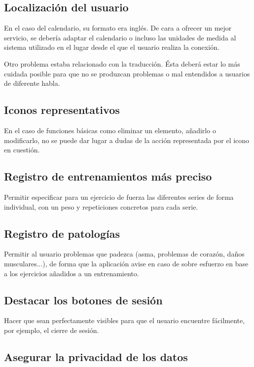 \documentclass[a4paper]{article}
\begin{document}
	\subsection{Localización del usuario}
	
	En el caso del calendario, su formato era inglés. De cara a ofrecer un mejor servicio, se debería adaptar el calendario o incluso las unidades de medida al sistema utilizado en el lugar desde el que el usuario realiza la conexión.
	
	Otro problema estaba relacionado con la traducción. Ésta deberá estar lo más cuidada posible para que no se produzcan problemas o mal entendidos a usuarios de diferente habla.
	
	\subsection{Iconos representativos}
	
	En el caso de funciones básicas como eliminar un elemento, añadirlo o modificarlo, no se puede dar lugar a dudas de la acción representada por el icono en cuestión.
	
	\subsection{Registro de entrenamientos más preciso}
	
	Permitir especificar para un ejercicio de fuerza las diferentes series de forma individual, con un peso y repeticiones concretos para cada serie.
	
	\subsection{Registro de patologías}
	
	Permitir al usuario problemas que padezca (asma, problemas de corazón, daños musculares...), de forma que la aplicación avise en caso de sobre esfuerzo en base a los ejercicios añadidos a un entrenamiento.
	
	\subsection{Destacar los botones de sesión}
	
	Hacer que sean perfectamente visibles para que el usuario encuentre fácilmente, por ejemplo, el cierre de sesión.

	\subsection{Asegurar la privacidad de los datos}
	
\end{document}

